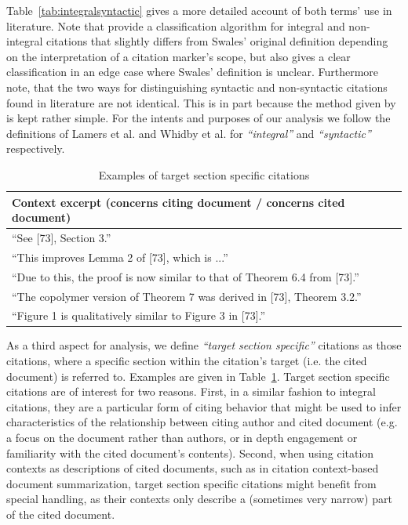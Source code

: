 Table~\ref{tab:integralsyntactic} gives a more detailed account of both terms' use in literature. Note that \cite{Lamers2018} provide a classification algorithm for integral and non-integral citations that slightly differs from Swales' original definition depending on the interpretation of a citation marker's scope, but also gives a clear classification in an edge case where Swales' definition is unclear. Furthermore note, that the two ways for distinguishing syntactic and non-syntactic citations found in literature are not identical. This is in part because the method given by \cite{Abujbara2012} is kept rather simple. For the intents and purposes of our analysis we follow the definitions of Lamers et al. and Whidby et al. for \emph{``integral''} and \emph{``syntactic''} respectively.

\begin{table}
\centering
    \caption{Examples of target section specific citations}
    \label{tab:secspec}
\begin{center}
    \begin{tabular}{l}
    \toprule
    Context excerpt ({\color{UniBlue}concerns citing document} / {\color{RandomRed}concerns cited document}) \\
    \midrule
    ``See [73], {\color{RandomRed}Section 3}.'' \\
    ``This improves {\color{RandomRed}Lemma 2} of [73], which is ...'' \\
    ``Due to this, the proof is now similar to that of {\color{RandomRed}Theorem 6.4} from [73].'' \\
    ``The copolymer version of {\color{UniBlue}Theorem 7} was derived in [73], {\color{RandomRed}Theorem 3.2}.''  \\
    ``{\color{UniBlue}Figure 1} is qualitatively similar to {\color{RandomRed}Figure 3} in [73].'' \\
    \bottomrule
    \end{tabular}
\end{center}
\end{table}

As a third aspect for analysis, we define \emph{``target section specific''} citations as those citations, where a specific section within the citation's target (i.e. the cited document) is referred to. Examples are given in Table~\ref{tab:secspec}. Target section specific citations are of interest for two reasons. First, in a similar fashion to integral citations, they are a particular form of citing behavior that might be used to infer characteristics of the relationship between citing author and cited document (e.g. a focus on the document rather than authors, or in depth engagement or familiarity with the cited document's contents). Second, when using citation contexts as descriptions of cited documents, such as in citation context-based document summarization, target section specific citations might benefit from special handling, as their contexts only describe a (sometimes very narrow) part of the cited document.

